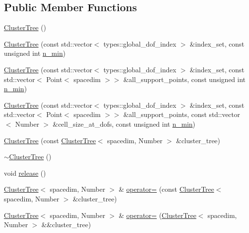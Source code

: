 \subsection*{Public Member Functions}
\begin{DoxyCompactItemize}
\item 
\hyperlink{classClusterTree_a28b31e2fbe58c74eff89a1a8e2124e10}{Cluster\+Tree} ()
\item 
\hyperlink{classClusterTree_ae21fda96c7d405825a853f8759c0cc4c}{Cluster\+Tree} (const std\+::vector$<$ types\+::global\+\_\+dof\+\_\+index $>$ \&index\+\_\+set, const unsigned int \hyperlink{classClusterTree_a5af4448800c4ddc98121706754bfe3f9}{n\+\_\+min})
\item 
\hyperlink{classClusterTree_a587c465f14f7fa0e0e6a82aa8733452f}{Cluster\+Tree} (const std\+::vector$<$ types\+::global\+\_\+dof\+\_\+index $>$ \&index\+\_\+set, const std\+::vector$<$ Point$<$ spacedim $>$$>$ \&all\+\_\+support\+\_\+points, const unsigned int \hyperlink{classClusterTree_a5af4448800c4ddc98121706754bfe3f9}{n\+\_\+min})
\item 
\hyperlink{classClusterTree_a3fd518db632c62cfafb61e9ef56097c7}{Cluster\+Tree} (const std\+::vector$<$ types\+::global\+\_\+dof\+\_\+index $>$ \&index\+\_\+set, const std\+::vector$<$ Point$<$ spacedim $>$$>$ \&all\+\_\+support\+\_\+points, const std\+::vector$<$ Number $>$ \&cell\+\_\+size\+\_\+at\+\_\+dofs, const unsigned int \hyperlink{classClusterTree_a5af4448800c4ddc98121706754bfe3f9}{n\+\_\+min})
\item 
\hyperlink{classClusterTree_a40d41a3a87bee15fe2d0b39a42f705d2}{Cluster\+Tree} (const \hyperlink{classClusterTree}{Cluster\+Tree}$<$ spacedim, Number $>$ \&cluster\+\_\+tree)
\item 
\hyperlink{classClusterTree_ad1b0ac0f6474de90d4fb528b6ed28db6}{$\sim$\+Cluster\+Tree} ()
\item 
void \hyperlink{classClusterTree_a2dc8b94ebdc4e5efb885940204f614e1}{release} ()
\item 
\hyperlink{classClusterTree}{Cluster\+Tree}$<$ spacedim, Number $>$ \& \hyperlink{classClusterTree_a3a4e51a1a09f759f085ab140db914af9}{operator=} (const \hyperlink{classClusterTree}{Cluster\+Tree}$<$ spacedim, Number $>$ \&cluster\+\_\+tree)
\item 
\hyperlink{classClusterTree}{Cluster\+Tree}$<$ spacedim, Number $>$ \& \hyperlink{classClusterTree_a9700796d8fb849b3171c0c7d461a2380}{operator=} (\hyperlink{classClusterTree}{Cluster\+Tree}$<$ spacedim, Number $>$ \&\&cluster\+\_\+tree)
\item 

\end{DoxyCompactItemize}
